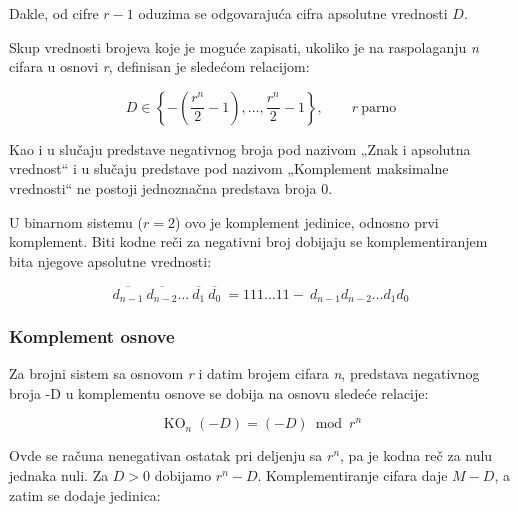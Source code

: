 \documentclass[a4paper,11pt]{article}
\numberwithin{equation}{section}
\begin{document}
Dakle, od cifre $r-1$ oduzima se odgovarajuća cifra apsolutne vrednosti $D$.



Skup vrednosti brojeva koje je moguće zapisati, ukoliko je na raspolaganju \emph{n} cifara u osnovi \emph{r}, definisan je sledećom relacijom:



\begin{equation}\label{eq:1.2.2.4}
D\in\left\{-\left(\frac{r^n}{2}-1\right),\dots,\frac{r^n}{2}-1\right\},\qquad r\ \text{parno}
\end{equation}


Kao i u slučaju predstave negativnog broja pod nazivom „Znak i apsolutna vrednost“ i u slučaju predstave pod nazivom „Komplement maksimalne vrednosti“ ne postoji jednoznačna predstava broja 0.



U binarnom sistemu ($r=2$) ovo je komplement jedinice, odnosno prvi komplement. Biti kodne reči za negativni broj dobijaju se komplementiranjem bita njegove apsolutne vrednosti:

\begin{equation}\label{eq:1.2.2.5}
\overline{d_{n - 1}}\ \overline{d_{n - 2}}\ldots\ \overline{d_{1}}\ \overline{d_{0}}\  = 111\ldots 11 - \ d_{n - 1}d_{n - 2}\ldots d_{1}d_{0}
\end{equation}


\subsubsection{Komplement osnove}\label{sec:1.2.3}


Za brojni sistem sa osnovom \emph{r} i datim brojem cifara \emph{n}, predstava negativnog broja -D u komplementu osnove se dobija na osnovu sledeće relacije:



\begin{equation}\label{eq:1.2.3.1}
\operatorname{KO}_n(-D)=(-D)\bmod r^n
\end{equation}


Ovde se računa nenegativan ostatak pri deljenju sa $r^n$, pa je kodna reč za nulu jednaka nuli. Za $D>0$ dobijamo $r^n-D$. Komplementiranje cifara daje $M-D$, a zatim se dodaje jedinica:
\end{document}
